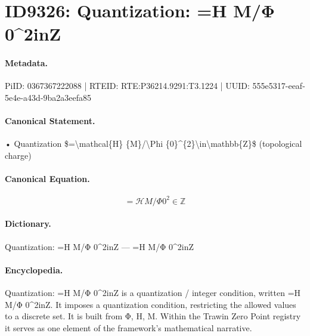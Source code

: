 \section*{ID9326: Quantization: =H M/Φ 0\textasciicircum{}2inZ}
\paragraph{Metadata.}
PiID: 0367367222088 | RTEID: RTE:P36214.9291:T3.1224 | UUID: 555e5317-eeaf-5e4e-a43d-9ba2a3eefa85

\paragraph{Canonical Statement.}
• Quantization \$=\textbackslash{}mathcal\{H\} \{M\}/\textbackslash{}Phi \{0\}\textasciicircum{}\{2\}\textbackslash{}in\textbackslash{}mathbb\{Z\}\$ (topological charge)

\paragraph{Canonical Equation.}
\[
=\mathcal{H} {M}/\Phi {0}^{2}\in\mathbb{Z}
\]

\paragraph{Dictionary.}
Quantization: =H M/Φ 0\textasciicircum{}2inZ — =H M/Φ 0\textasciicircum{}2inZ

\paragraph{Encyclopedia.}
Quantization: =H M/Φ 0\textasciicircum{}2inZ is a quantization / integer condition, written =H M/Φ 0\textasciicircum{}2inZ. It imposes a quantization condition, restricting the allowed values to a discrete set. It is built from Φ, H, M. Within the Trawin Zero Point registry it serves as one element of the framework's mathematical narrative.
